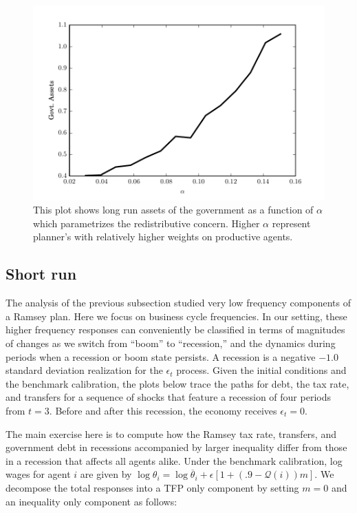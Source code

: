 \documentclass[thmsb,11pt]{article}
\begin{document}
 {
  \begin{figure}
    \centering
    \includegraphics[width = .9\textwidth]{cesplots/comp_stats_alpha.pdf}
    \caption{This plot shows long run assets of the government as a function of $\alpha$ which parametrizes the redistributive concern. Higher $\alpha$ represent planner's with relatively higher weights on productive agents.}
      \label{fig: comp_stats_alpha}
  \end{figure}

}




\subsection{Short run}
The analysis of the previous subsection studied  very low
frequency components of  a Ramsey plan. Here  we focus on business cycle frequencies.
 In our setting,  these higher frequency responses can conveniently be classified  in terms of  magnitudes of changes as we switch from ``boom''
to ``recession,'' and the dynamics during  periods when a recession or boom state persists. A recession is a negative $-1.0$ standard deviation realization for the $\epsilon_t$ process. Given the initial conditions and the benchmark calibration, the plots below trace the paths
for debt, the tax rate,  and transfers for a sequence of shocks that feature a recession of four periods from $t=3$. Before and after this recession, the economy receives $\epsilon_t=0$.

The main exercise here is to compute how the Ramsey tax rate, transfers, and government debt in recessions accompanied by larger inequality differ from those
in a recession that affects all agents alike. Under the benchmark calibration, log wages for agent $i$
are given by $\log \theta_i=\log \overline{\theta}_i+\epsilon [1+(.9-\mathcal{Q}(i))m]$. We decompose the total responses into a
 TFP only component by setting $m=0$ and an inequality only component as follows:
\end{document}
